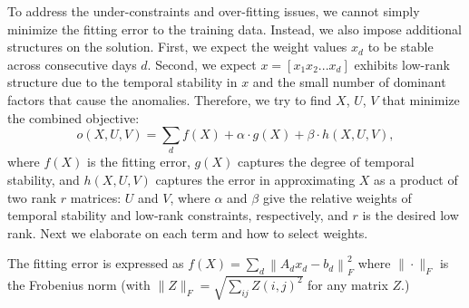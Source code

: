 To address the under-constraints and over-fitting issues, we cannot 
simply minimize the fitting error to the training data. 
Instead, we also impose additional structures on the solution. First, we expect
the weight values $x_d$ to be stable across consecutive days $d$. Second, 
we expect $x = [x_1 x_2 ... x_d]$ exhibits low-rank structure due to
the temporal stability in $x$ and the small number of dominant factors
that cause the anomalies. 
Therefore, we 
try to find $X$, $U$, $V$ that minimize the combined objective:
\begin{equation}
o(X,U,V) = \sum_d f(X) + \alpha\cdot g(X) + \beta\cdot h(X,U,V),
\label{eq:c(X)}
\end{equation}
where $f(X)$ is the fitting error, $g(X)$ captures the degree of
temporal stability, and $h(X,U,V)$ captures the error in approximating
$X$ as a product of two rank $r$ matrices: $U$ and $V$, where $\alpha$ 
and $\beta$ give the relative weights of temporal
stability and low-rank constraints, respectively, and $r$ is
the desired low rank.
Next we elaborate on each term and how to select weights.

 The fitting error is expressed as
$f(X) = \sum_d \left\|A_d x_d - b_d\right\|_F^2$ 
where $\|\cdot\|_F$ is the Frobenius norm 
(with $\|Z\|_F = \sqrt{\sum_{ij} Z(i,j)^2 }$ for any matrix $Z$.)

